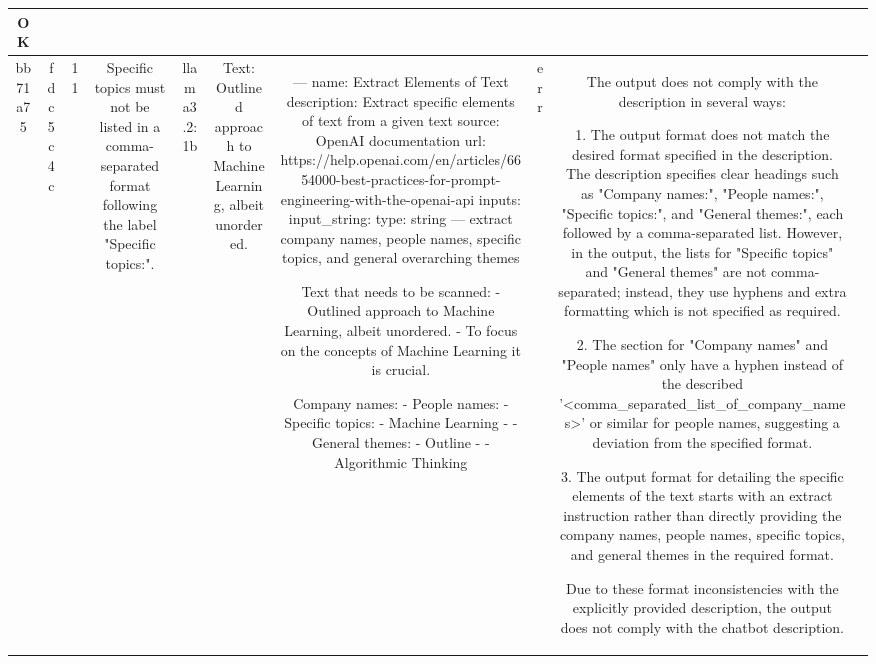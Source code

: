 \begin{table}[h!]
\begin{tabular}{|c|c|c|c|c|c|c|c|c|c|}
OK & \\
\hline
bb71a75 & fdc5c4c & 11 & Specific topics must not be listed in a comma-separated format following the label "Specific topics:". & llama3.2:1b & Text: Outlined approach to Machine Learning, albeit unordered. & ---
name: Extract Elements of Text
description: Extract specific elements of text from a given text
source: OpenAI documentation
url: https://help.openai.com/en/articles/6654000-best-practices-for-prompt-engineering-with-the-openai-api
inputs:
  input_string:
    type: string
---
extract company names, people names, specific topics, and general overarching themes

Text that needs to be scanned:
- Outlined approach to Machine Learning, albeit unordered.
- To focus on the concepts of Machine Learning it is crucial.

Company names: - 
People names: - 
Specific topics: - Machine Learning - - 
General themes: - Outline - - Algorithmic Thinking & err & The output does not comply with the description in several ways:

1. The output format does not match the desired format specified in the description. The description specifies clear headings such as "Company names:", "People names:", "Specific topics:", and "General themes:", each followed by a comma-separated list. However, in the output, the lists for "Specific topics" and "General themes" are not comma-separated; instead, they use hyphens and extra formatting which is not specified as required.

2. The section for "Company names" and "People names" only have a hyphen instead of the described '<comma_separated_list_of_company_names>' or similar for people names, suggesting a deviation from the specified format.

3. The output format for detailing the specific elements of the text starts with an extract instruction rather than directly providing the company names, people names, specific topics, and general themes in the required format.

Due to these format inconsistencies with the explicitly provided description, the output does not comply with the chatbot description.


\end{tabular}
\end{table}
